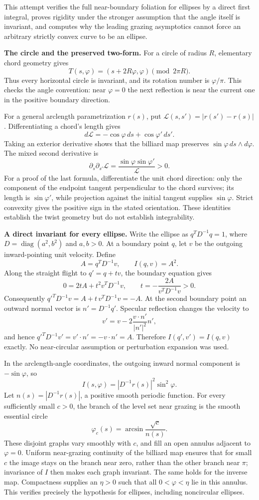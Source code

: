 \documentclass[11pt]{article}
\begin{document}
This attempt verifies the full near-boundary foliation for ellipses by a
direct first integral, proves rigidity under the stronger assumption that
the angle itself is invariant, and computes why the leading grazing
asymptotics cannot force an arbitrary strictly convex curve to be an ellipse.

\textbf{The circle and the preserved two-form.}
For a circle of radius $R$, elementary chord geometry gives
\[
 T(s,\varphi)=(s+2R\varphi,\varphi)\pmod{2\pi R}.
\]
Thus every horizontal circle is invariant, and its rotation number is
$\varphi/\pi$.  This checks the angle convention: near $\varphi=0$ the next
reflection is near the current one in the positive boundary direction.

For a general arclength parametrization $r(s)$, put
$\mathcal L(s,s')=|r(s')-r(s)|$.  Differentiating a chord's length gives
\[
 d\mathcal L=-\cos\varphi\,ds+\cos\varphi'\,ds'.
\]
Taking an exterior derivative shows that the billiard map preserves
$\sin\varphi\,ds\wedge d\varphi$.  The mixed second derivative is
\[
 \partial_s\partial_{s'}\mathcal L
 =\frac{\sin\varphi\sin\varphi'}{\mathcal L}>0.
\]
For a proof of the last formula, differentiate the unit chord direction:
only the component of the endpoint tangent perpendicular to the chord
survives; its length is $\sin\varphi'$, while projection against the initial
tangent supplies $\sin\varphi$.  Strict convexity gives the positive sign
in the stated orientation.  These identities establish the twist geometry
but do not establish integrability.

\textbf{A direct invariant for every ellipse.}
Write the ellipse as $q^TD^{-1}q=1$, where
$D=\operatorname{diag}(a^2,b^2)$ and $a,b>0$.  At a boundary point $q$, let
$v$ be the outgoing inward-pointing unit velocity.  Define
\[
 A=q^TD^{-1}v,\qquad I(q,v)=A^2.
\]
Along the straight flight to $q'=q+tv$, the boundary equation gives
\[
 0=2tA+t^2v^TD^{-1}v,
 \qquad t=-\frac{2A}{v^TD^{-1}v}>0.
\]
Consequently $q'^TD^{-1}v=A+t\,v^TD^{-1}v=-A$.
At the second boundary point an outward normal vector is $n'=D^{-1}q'$.
Specular reflection changes the velocity to
\[
 v'=v-2\frac{v\cdot n'}{|n'|^2}n',
\]
and hence $q'^TD^{-1}v'=v'\cdot n'=-v\cdot n'=A$.
Therefore $I(q',v')=I(q,v)$ exactly.  No near-circular assumption or
perturbation expansion was used.

In the arclength-angle coordinates, the outgoing inward normal component is
$-\sin\varphi$, so
\[
 I(s,\varphi)=|D^{-1}r(s)|^2\sin^2\varphi.
\]
Let $n(s)=|D^{-1}r(s)|$, a positive smooth periodic function.  For every
sufficiently small $c>0$, the branch of the level set near grazing is the
smooth essential circle
\[
 \varphi_c(s)=\arcsin\frac{\sqrt c}{n(s)}.
\]
These disjoint graphs vary smoothly with $c$, and fill an open annulus
adjacent to $\varphi=0$.  Uniform near-grazing continuity of the billiard map
ensures that for small $c$ the image stays on the branch near zero, rather
than the other branch near $\pi$; invariance of $I$ then makes each graph
invariant.  The same holds for the inverse map.  Compactness supplies an
$\eta>0$ such that all $0<\varphi<\eta$ lie in this annulus.  This verifies
precisely the hypothesis for ellipses, including noncircular ellipses.
\end{document}

